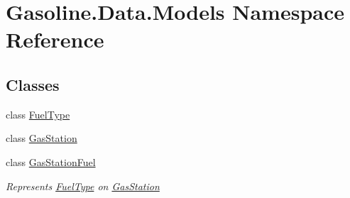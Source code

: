 \hypertarget{namespace_gasoline_1_1_data_1_1_models}{}\section{Gasoline.\+Data.\+Models Namespace Reference}
\label{namespace_gasoline_1_1_data_1_1_models}
\subsection*{Classes}
\begin{DoxyCompactItemize}
\item 
class \mbox{\hyperlink{class_gasoline_1_1_data_1_1_models_1_1_fuel_type}{Fuel\+Type}}
\item 
class \mbox{\hyperlink{class_gasoline_1_1_data_1_1_models_1_1_gas_station}{Gas\+Station}}
\item 
class \mbox{\hyperlink{class_gasoline_1_1_data_1_1_models_1_1_gas_station_fuel}{Gas\+Station\+Fuel}}
\begin{DoxyCompactList}\small\item\em Represents \mbox{\hyperlink{class_gasoline_1_1_data_1_1_models_1_1_fuel_type}{Fuel\+Type}} on \mbox{\hyperlink{class_gasoline_1_1_data_1_1_models_1_1_gas_station}{Gas\+Station}} \end{DoxyCompactList}\end{DoxyCompactItemize}
